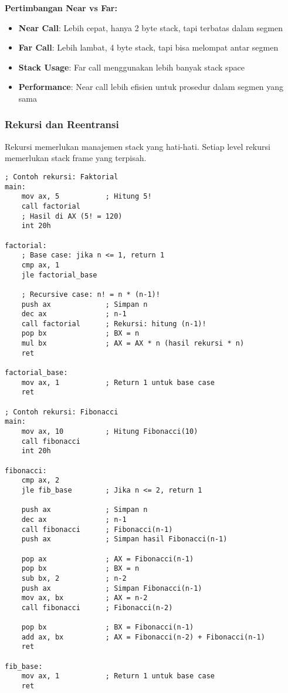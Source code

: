 \documentclass[../main.tex]{subfiles}
\begin{document}
                \textbf{Pertimbangan Near vs Far:}
                \begin{itemize}
                    \item \textbf{Near Call}: Lebih cepat, hanya 2 byte stack, tapi terbatas dalam segmen
                    \item \textbf{Far Call}: Lebih lambat, 4 byte stack, tapi bisa melompat antar segmen
                    \item \textbf{Stack Usage}: Far call menggunakan lebih banyak stack space
                    \item \textbf{Performance}: Near call lebih efisien untuk prosedur dalam segmen yang sama
                \end{itemize}

            \subsubsection{Rekursi dan Reentransi}
                Rekursi memerlukan manajemen stack yang hati-hati. Setiap level rekursi memerlukan stack frame yang terpisah.

                \begin{lstlisting}[language={[x86masm]Assembler}, caption=Contoh Rekursi, label={lst:recursion-example}]
; Contoh rekursi: Faktorial
main:
    mov ax, 5           ; Hitung 5!
    call factorial
    ; Hasil di AX (5! = 120)
    int 20h

factorial:
    ; Base case: jika n <= 1, return 1
    cmp ax, 1
    jle factorial_base
    
    ; Recursive case: n! = n * (n-1)!
    push ax             ; Simpan n
    dec ax              ; n-1
    call factorial      ; Rekursi: hitung (n-1)!
    pop bx              ; BX = n
    mul bx              ; AX = AX * n (hasil rekursi * n)
    ret

factorial_base:
    mov ax, 1           ; Return 1 untuk base case
    ret

; Contoh rekursi: Fibonacci
main:
    mov ax, 10          ; Hitung Fibonacci(10)
    call fibonacci
    int 20h

fibonacci:
    cmp ax, 2
    jle fib_base        ; Jika n <= 2, return 1
    
    push ax             ; Simpan n
    dec ax              ; n-1
    call fibonacci      ; Fibonacci(n-1)
    push ax             ; Simpan hasil Fibonacci(n-1)
    
    pop ax              ; AX = Fibonacci(n-1)
    pop bx              ; BX = n
    sub bx, 2           ; n-2
    push ax             ; Simpan Fibonacci(n-1)
    mov ax, bx          ; AX = n-2
    call fibonacci      ; Fibonacci(n-2)
    
    pop bx              ; BX = Fibonacci(n-1)
    add ax, bx          ; AX = Fibonacci(n-2) + Fibonacci(n-1)
    ret

fib_base:
    mov ax, 1           ; Return 1 untuk base case
    ret
                \end{lstlisting}
\end{document}
